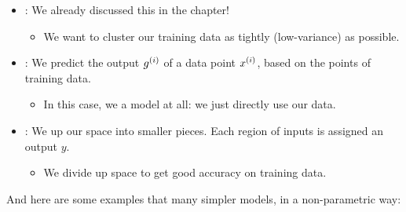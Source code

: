         \begin{itemize}
            \item {}: We already discussed this in the  chapter! 

                \begin{itemize}
                    \item We want to cluster our training data as tightly (low-variance) as possible.
                \end{itemize}

            
            \item {}: We predict the output $g^{(i)}$ of a data point $x^{(i)}$, based on the  points of training data.

                \begin{itemize}
                    \item In this case, we  a model at all: we just directly use our data.
                \end{itemize}
            
            \item {}: We  up our space into smaller pieces. Each region of inputs is assigned an output $y$.

                \begin{itemize}
                    \item We divide up space to get good accuracy on training data.
                \end{itemize}
            
        \end{itemize}

        And here are some examples that  many simpler models, in a non-parametric way:

